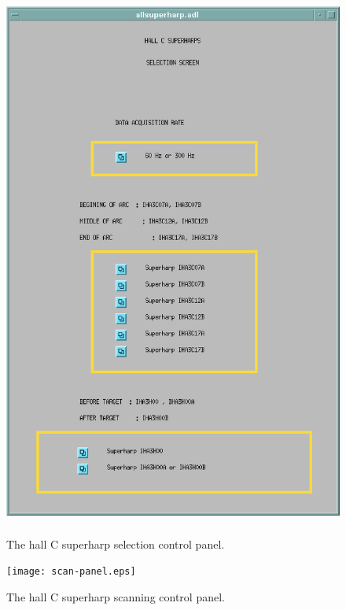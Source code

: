 \begin{figure}[!hbt]
\begin{center}
\includegraphics[height=7.2in]{superharpChoicePanel.ps}
\caption{The hall C superharp selection control panel.}\label{figure:choose_harp}
\end{center}
\end{figure}


\begin{figure}[!hbt]
\begin{center}
\texttt{[image: scan-panel.eps]}
\caption{The hall C superharp scanning control panel.}\label{figure:scan_harp}
\end{center}
\end{figure}

